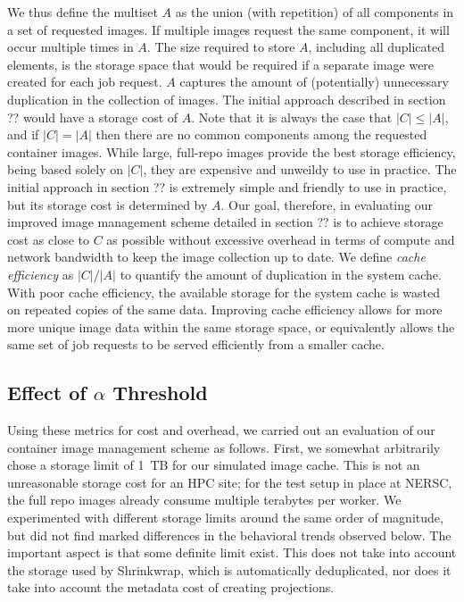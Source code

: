 \documentclass[sigconf]{acmart}
\begin{document}
We thus define the multiset $A$ as the union (with repetition) of all components in a set of requested images.
If multiple images request the same component,
it will occur multiple times in $A$.
The size required to store $A$,
including all duplicated elements,
is the storage space that would be required if a separate image were created for each job request.
$A$ captures the amount of (potentially) unnecessary duplication in the collection of images.
The initial approach described in section ?? would have a storage cost of $A$.
Note that it is always the case that $|C| \leq |A|$,
and if $|C| = |A|$ then there are no common components among the requested container images.
While large, full-repo images provide the best storage efficiency, being based solely on $|C|$,
they are expensive and unweildy to use in practice.
The initial approach in section ?? is extremely simple and friendly to use in practice,
but its storage cost is determined by $A$.
Our goal, therefore, in evaluating our improved image management scheme detailed in section ?? is to achieve storage cost as close to $C$ as possible without excessive overhead in terms of compute and network bandwidth to keep the image collection up to date.
We define \emph{cache efficiency} as $|C| / |A|$ to quantify the amount of duplication in the system cache.
With poor cache efficiency,
the available storage for the system cache is wasted on repeated copies of the same data.
Improving cache efficiency allows for more more unique image data within the same storage space,
or equivalently allows the same set of job requests to be served efficiently from a smaller cache.

\subsection{Effect of $\alpha$ Threshold}

Using these metrics for cost and overhead,
we carried out an evaluation of our container image management scheme as follows.
First, we somewhat arbitrarily chose a storage limit of 1~TB for our simulated image cache.
This is not an unreasonable storage cost for an HPC site;
for the test setup in place at NERSC,
the full repo images already consume multiple terabytes per worker.
We experimented with different storage limits around the same order of magnitude,
but did not find marked differences in the behavioral trends observed below.
The important aspect is that some definite limit exist.
This does not take into account the storage used by Shrinkwrap,
which is automatically deduplicated,
nor does it take into account the metadata cost of creating projections.
\end{document}
